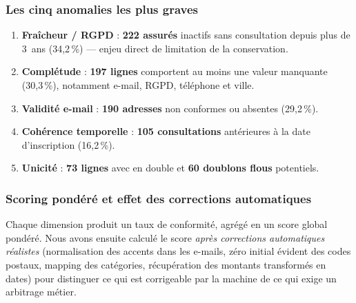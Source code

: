 \documentclass{article}
\newcommand{\code}[1]{\texttt{\seqsplit{#1}}}
\begin{document}
\subsubsection{Les cinq anomalies les plus graves}

\begin{enumerate}
    \item \textbf{Fraîcheur / RGPD} : \textbf{222 assurés} inactifs sans consultation
          depuis plus de 3~ans (34,2\,\%) --- enjeu direct de limitation de la
          conservation.
    \item \textbf{Complétude} : \textbf{197 lignes} comportent au moins une valeur
          manquante (30,3\,\%), notamment e-mail, RGPD, téléphone et ville.
    \item \textbf{Validité e-mail} : \textbf{190 adresses} non conformes ou absentes
          (29,2\,\%).
    \item \textbf{Cohérence temporelle} : \textbf{105 consultations} antérieures à la
          date d'inscription (16,2\,\%).
    \item \textbf{Unicité} : \textbf{73 lignes} avec \code{id\_assure} en double et
          \textbf{60 doublons flous} potentiels.
\end{enumerate}

\subsubsection{Scoring pondéré et effet des corrections automatiques}

Chaque dimension produit un taux de conformité, agrégé en un score global pondéré.
Nous avons ensuite calculé le score \emph{après corrections automatiques réalistes}
(normalisation des accents dans les e-mails, zéro initial évident des codes postaux,
mapping des catégories, récupération des montants transformés en dates) pour
distinguer ce qui est corrigeable par la machine de ce qui exige un arbitrage métier.
\end{document}
